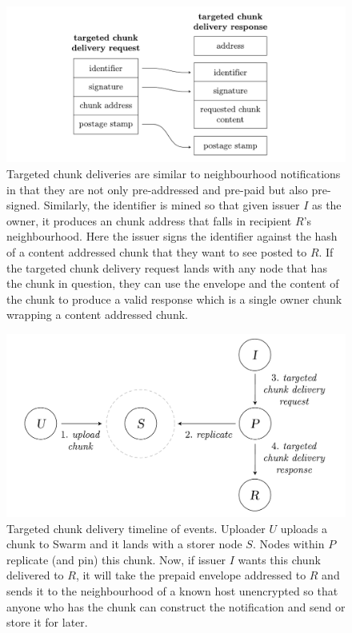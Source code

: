 \begin{figure}[htbp]
\centering
\includegraphics[width=\textwidth]{fig/targeted-chunk-delivery.pdf}      
\caption[Targeted chunk deliveries \statusgreen]{Targeted chunk deliveries are similar to neighbourhood notifications in that they are not only pre-addressed and pre-paid but also pre-signed. Similarly, the identifier is mined so that given issuer $I$ as the owner, it produces an chunk address that falls in recipient $R$'s neighbourhood. Here the issuer signs the identifier against the hash of a content addressed chunk that they want to see posted to $R$. If the targeted chunk delivery request lands with any node that has the chunk in question, they can use the envelope and the content of the chunk to produce a valid response which is a single owner chunk wrapping a content addressed chunk.}
\label{fig:targeted-chunk-delivery}
\end{figure}

\begin{figure}[htbp]
\centering
\includegraphics[width=.8\textwidth]{fig/targeted-chunk-delivery-events.pdf}
\caption[Targeted chunk delivery timeline of events\statusgreen]{Targeted chunk delivery timeline of events. Uploader $U$ uploads a chunk to Swarm and it lands with a storer node $S$. Nodes within $P$ replicate (and pin) this chunk. Now, if issuer $I$ wants this chunk delivered to $R$, it will take the prepaid envelope addressed to $R$ and sends it to the neighbourhood of a known host unencrypted so that anyone who has the chunk can construct the notification and send or store it for later.}
\label{fig:targeted-chunk-delivery-events}
\end{figure}



